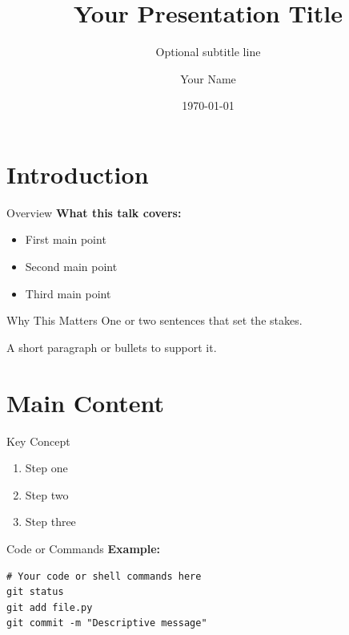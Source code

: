 \documentclass{beamer}
\title[Short Title for Footer]{Your Presentation Title}
\subtitle{Optional subtitle line}
\author[Your Name]{Your Name}
\date{\today}
\begin{document}
\maketitle

\section{Introduction}

\begin{frame}{Overview}
    \textbf{What this talk covers:}
    \begin{itemize}
        \item First main point
        \item Second main point
        \item Third main point
    \end{itemize}
\end{frame}

\begin{frame}{Why This Matters}
    \Large
    One or two sentences that set the stakes.

    \vspace{1em}
    \normalsize
    A short paragraph or bullets to support it.
\end{frame}

\section{Main Content}

\begin{frame}{Key Concept}
    \begin{enumerate}
        \item Step one
        \item Step two
        \item Step three
    \end{enumerate}
\end{frame}

\begin{frame}[fragile]{Code or Commands}
    \textbf{Example:}
    \begin{lstlisting}
# Your code or shell commands here
git status
git add file.py
git commit -m "Descriptive message"
    \end{lstlisting}
\end{frame}
\end{document}
